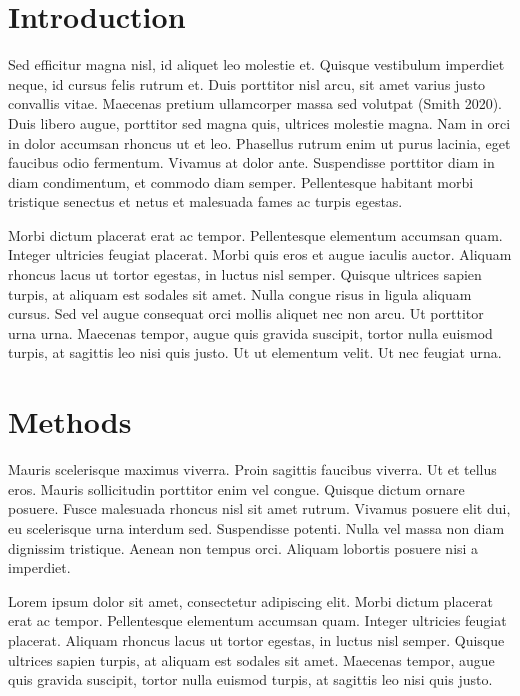\documentclass[12pt,letterpaper]{article}
\begin{document}
\section{Introduction}
Sed efficitur magna nisl, id aliquet leo molestie et. Quisque vestibulum imperdiet
neque, id cursus felis rutrum et. Duis porttitor nisl arcu, sit amet varius justo
convallis vitae. Maecenas pretium ullamcorper massa sed volutpat (Smith 2020). Duis
libero augue, porttitor sed magna quis, ultrices molestie magna. Nam in orci in dolor
accumsan rhoncus ut et leo. Phasellus rutrum enim ut purus lacinia, eget faucibus
odio fermentum. Vivamus at dolor ante. Suspendisse porttitor diam in diam
condimentum, et commodo diam semper. Pellentesque habitant morbi tristique senectus
et netus et malesuada fames ac turpis egestas.

Morbi dictum placerat erat ac tempor. Pellentesque elementum accumsan quam. Integer
ultricies feugiat placerat. Morbi quis eros et augue iaculis auctor. Aliquam rhoncus
lacus ut tortor egestas, in luctus nisl semper. Quisque ultrices sapien turpis, at
aliquam est sodales sit amet. Nulla congue risus in ligula aliquam cursus. Sed vel
augue consequat orci mollis aliquet nec non arcu. Ut porttitor urna urna. Maecenas
tempor, augue quis gravida suscipit, tortor nulla euismod turpis, at sagittis leo
nisi quis justo. Ut ut elementum velit. Ut nec feugiat urna.

\section{Methods}
Mauris scelerisque maximus viverra. Proin sagittis faucibus viverra. Ut et tellus
eros. Mauris sollicitudin porttitor enim vel congue. Quisque dictum ornare posuere.
Fusce malesuada rhoncus nisl sit amet rutrum. Vivamus posuere elit dui, eu
scelerisque urna interdum sed. Suspendisse potenti. Nulla vel massa non diam
dignissim tristique. Aenean non tempus orci. Aliquam lobortis posuere nisi a
imperdiet.

Lorem ipsum dolor sit amet, consectetur adipiscing elit. Morbi dictum placerat erat
ac tempor. Pellentesque elementum accumsan quam. Integer ultricies feugiat placerat.
Aliquam rhoncus lacus ut tortor egestas, in luctus nisl semper. Quisque ultrices
sapien turpis, at aliquam est sodales sit amet. Maecenas tempor, augue quis gravida
suscipit, tortor nulla euismod turpis, at sagittis leo nisi quis justo.
\end{document}
